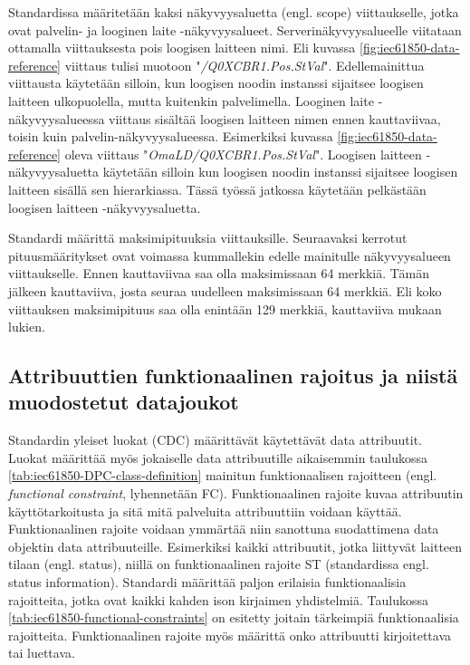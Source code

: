 Standardissa määritetään kaksi näkyvyysaluetta (engl. scope) viittaukselle, jotka ovat palvelin- ja looginen laite -näkyvyysalueet. Serverinäkyvyysalueelle viitataan ottamalla viittauksesta pois loogisen laitteen nimi. Eli kuvassa \ref{fig:iec61850-data-reference} viittaus tulisi muotoon "\emph{/Q0XCBR1.Pos.StVal}". Edellemainittua viittausta käytetään silloin, kun loogisen noodin instanssi sijaitsee loogisen laitteen ulkopuolella, mutta kuitenkin palvelimella. Looginen laite -näkyvyysalueessa viittaus sisältää loogisen laitteen nimen ennen kauttaviivaa, toisin kuin palvelin-näkyvyysalueessa. Esimerkiksi kuvassa \ref{fig:iec61850-data-reference} oleva viittaus "\emph{OmaLD/Q0XCBR1.Pos.StVal}". Loogisen laitteen -näkyvyysaluetta käytetään silloin kun loogisen noodin instanssi sijaitsee loogisen laitteen sisällä sen hierarkiassa. Tässä työssä jatkossa käytetään pelkästään loogisen laitteen -näkyvyysaluetta. \cite[s.~183]{IEC61850-7-2}

Standardi määrittä maksimipituuksia viittauksille. Seuraavaksi kerrotut pituusmääritykset ovat voimassa kummallekin edelle mainitulle näkyvyysalueen viittaukselle. Ennen kauttaviivaa saa olla maksimissaan 64 merkkiä. Tämän jälkeen kauttaviiva, josta seuraa uudelleen maksimissaan 64 merkkiä. Eli koko viittauksen maksimipituus saa olla enintään 129 merkkiä, kauttaviiva mukaan lukien. \cite[s.~24,183]{IEC61850-7-2}


\subsection{Attribuuttien funktionaalinen rajoitus ja niistä muodostetut datajoukot}
Standardin yleiset luokat (CDC) määrittävät käytettävät data attribuutit. Luokat määrittää myös jokaiselle data attribuutille aikaisemmin taulukossa \ref{tab:iec61850-DPC-class-definition} mainitun funktionaalisen rajoitteen (engl. \emph{functional constraint}, lyhennetään FC). Funktionaalinen rajoite kuvaa attribuutin käyttötarkoitusta ja sitä mitä palveluita attribuuttiin voidaan käyttää. Funktionaalinen rajoite voidaan ymmärtää niin sanottuna suodattimena data objektin data attribuuteille. Esimerkiksi kaikki attribuutit, jotka liittyvät laitteen tilaan (engl. status), niillä on funktionaalinen rajoite ST (standardissa engl. status information). Standardi määrittää paljon erilaisia funktionaalisia rajoitteita, jotka ovat kaikki kahden ison kirjaimen yhdistelmiä. Taulukossa \ref{tab:iec61850-functional-constraints} on esitetty joitain tärkeimpiä funktionaalisia rajoitteita. Funktionaalinen rajoite myös määrittä onko attribuutti kirjoitettava tai luettava.

